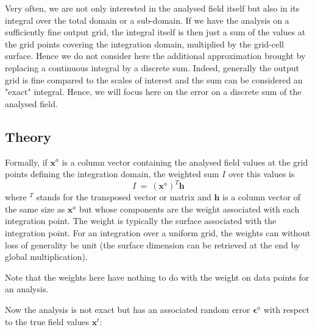 Very often, we are not only interested in the analysed field itself but also in its integral over the
total domain or a sub-domain. If we have the analysis on a sufficiently fine output grid, the integral
itself is then just a sum of the values at the grid points covering the integration domain, multiplied by the
grid-cell surface. Hence we do not consider here the additional approximation brought by replacing a continuous integral by
a discrete sum. Indeed, generally the output grid is fine compared to the scales of interest
and the sum can be considered an "exact" integral. Hence, we will focus here on the error on a discrete sum of the analysed field.

\subsection{Theory}

Formally, if $\mathbf{x}^a$ is a column vector containing the analysed field values at the grid
points defining the integration domain, the weighted sum $I$ over this values is
\begin{equation}
I~=~(\mathbf{x}^a)^T \mathbf{h}
\end{equation}
where $^{T}$ stands for the transposed vector or matrix and $\mathbf{h}$ is a column vector of the same size as
$\mathbf{x}^a$ but whose components are the weight associated with each integration point. The weight is typically the surface associated with
the integration point. For an integration over a uniform grid, the weights can without loss of generality be unit (the surface dimension can be retrieved at the end by global multiplication). 

Note that the weights here have nothing to do with the weight on data points for an analysis.

Now the analysis is not exact but has an associated random error $\mathbf{\epsilon}^a$ with respect to the true
field values $\mathbf{x}^t$:

